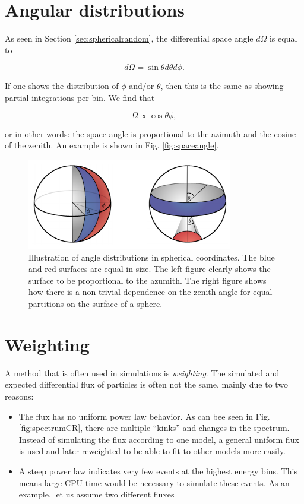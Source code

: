 \begin{appendices}
\section{Angular distributions}
\label{sec:angularappendix}
As seen in Section \ref{sec:sphericalrandom}, the differential space angle $d\Omega$ is equal to

\begin{equation}
d\Omega = \sin\theta d\theta d\phi.
\end{equation} 

\noindent If one shows the distribution of $\phi$ and/or $\theta$, then this is the same as showing partial integrations per bin. We find that

\begin{equation}
\Omega \propto \cos\theta \phi,
\end{equation}

\noindent or in other words: the space angle is proportional to the azimuth and the cosine of the zenith. An example is shown in Fig. \ref{fig:spaceangle}.

\begin{figure}
\centering
\includegraphics[width = 0.8\textwidth]{appendix/img/spaceangle.png}
\caption{Illustration of angle distributions in spherical coordinates. The blue and red surfaces are equal in size. The left figure clearly shows the surface to be proportional to the azumith. The right figure shows how there is a non-trivial dependence on the zenith angle for equal partitions on the surface of a sphere.}
\end{figure}

\section{Weighting}
\label{sec:weighting}
A method that is often used in simulations is \textit{weighting}. The simulated and expected differential flux of particles is often not the same, mainly due to two reasons:

\begin{itemize}
\item The flux has no uniform power law behavior. As can bee seen in Fig. \ref{fig:spectrumCR}, there are multiple ``kinks'' and changes in the spectrum. Instead of simulating the flux according to one model, a general uniform flux is used and later reweighted to be able to fit to other models more easily.
\item A steep power law indicates very few events at the highest energy bins. This means large CPU time would be necessary to simulate these events. As an example, let us assume two different fluxes


\end{itemize}
\end{appendices}

